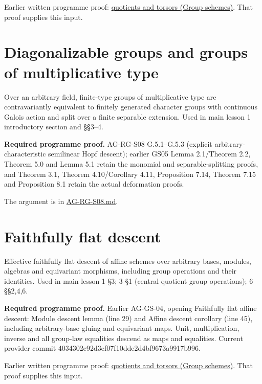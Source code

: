 \documentclass[11pt,a4paper,openany]{report}
\begin{document}
Earlier written programme proof: \href{https://github.com/KokunoYumeto/open-math-courses/blob/d02d0a3669f42579db037cd44de1d113fdd770a1/docs/courses/AG-GS/src/quotients-and-torsors.md}{quotients and torsors (Group schemes)}. That proof supplies this input.

\section{Diagonalizable groups and groups of multiplicative type}\label{diagonalizable-groups-and-groups-of-multiplicative-type}

Over an arbitrary field, finite-type groups of multiplicative type are contravariantly equivalent to finitely generated character groups with continuous Galois action and split over a finite separable extension. Used in main lesson 1 introductory section and §§3--4.

\textbf{Required programme proof.} AG-RG-S08 G.5.1--G.5.3 (explicit arbitrary-characteristic semilinear Hopf descent); earlier GS05 Lemma 2.1/Theorem 2.2, Theorem 5.0 and Lemma 5.1 retain the monomial and separable-splitting proofs, and Theorem 3.1, Theorem 4.10/Corollary 4.11, Proposition 7.14, Theorem 7.15 and Proposition 8.1 retain the actual deformation proofs.

The argument is in \href{https://github.com/KokunoYumeto/open-math-courses/blob/main/docs/courses/AG-RG/AG-RG-S08.md}{AG-RG-S08.md}.

\section{Faithfully flat descent}\label{faithfully-flat-descent}

Effective faithfully flat descent of affine schemes over arbitrary bases, modules, algebras and equivariant morphisms, including group operations and their identities. Used in main lesson 1 §3; 3 §1 (central quotient group operations); 6 §§2,4,6.

\textbf{Required programme proof.} Earlier AG-GS-04, opening Faithfully flat affine descent: Module descent lemma (line 29) and Affine descent corollary (line 45), including arbitrary-base gluing and equivariant maps. Unit, multiplication, inverse and all group-law equalities descend as maps and equalities. Current provider commit 4034302e92d3ef07f10dde2d4bf9673a9917b996.

Earlier written programme proof: \href{https://github.com/KokunoYumeto/open-math-courses/blob/d02d0a3669f42579db037cd44de1d113fdd770a1/docs/courses/AG-GS/src/quotients-and-torsors.md}{quotients and torsors (Group schemes)}. That proof supplies this input.
\end{document}
